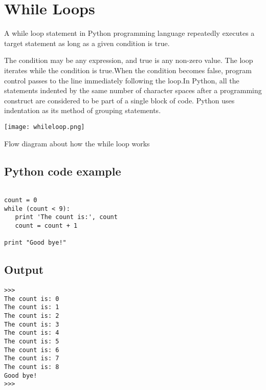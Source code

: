 \allsectionsfont{\centering \normalfont\scshape}











\section{\textbf{While Loops}}

A {\color{red}while loop} statement in Python programming language repeatedly executes a target statement as long as a given condition is true.

\vspace{1cm}
The condition may be any expression, and true is any non-zero value. The loop iterates while the condition is true.When the condition becomes false, program control passes to the line immediately following the loop.In Python, all the statements indented by the same number of character spaces after a programming construct are considered to be part of a single block of code. Python uses indentation as its method of grouping statements.

\begin{marginfigure}
  \texttt{[image: whileloop.png]}
  \caption{Flow diagram about how the while loop works}
  \label{fig:marginfig}
\end{marginfigure}

\vspace{0.5cm}
\subsection{Python code example}
\begin{framed}
\begin{verbatim}

count = 0
while (count < 9):
   print 'The count is:', count
   count = count + 1

print "Good bye!"

\end{verbatim}
\end{framed}

\subsection{Output}
\begin{shaded}
\begin{verbatim}
>>> 
The count is: 0
The count is: 1
The count is: 2
The count is: 3
The count is: 4
The count is: 5
The count is: 6
The count is: 7
The count is: 8
Good bye!
>>> 
\end{verbatim}
\end{shaded}

